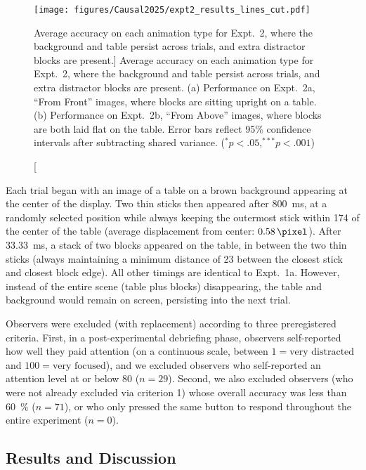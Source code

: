 \begin{figure}[ht]
    \centering
    \texttt{[image: figures/Causal2025/expt2\_results\_lines\_cut.pdf]}
    \caption
    [Average accuracy on each animation type for Expt.~2, where the background and table persist across trials, and extra distractor blocks are present.]
    {Average accuracy on each animation type for Expt.~2, where the background and table persist across trials, and extra distractor blocks are present.  (a) Performance on Expt.~2a, “From Front” images, where blocks are sitting upright on a table.  (b) Performance on Expt.~2b, “From Above” images, where blocks are both laid flat on the table.  Error bars reflect 95\% confidence intervals after subtracting shared variance. ($^{*}p < .05$,$^{***}p < .001$)}
    \label{fig:CausalHist_4}
\end{figure}

Each trial began with an image of a table on a brown background appearing at the center of the display.  Two thin sticks then appeared after \qty{800}{\milli\second}, at a randomly selected position while always keeping the outermost stick within \qty{174}{\pixel} of the center of the table (average displacement from center: $\qty{0.58}{\pixel}$).  After \qty{33.33}{\milli\second}, a stack of two blocks appeared on the table, in between the two thin sticks (always maintaining a minimum distance of \qty{23}{\pixel} between the closest stick and closest block edge).  All other timings are identical to Expt.~1a.  However, instead of the entire scene (table plus blocks) disappearing, the table and background would remain on screen, persisting into the next trial.

Observers were excluded (with replacement) according to three preregistered criteria. First, in a post-experimental debriefing phase, observers self-reported how well they paid attention (on a continuous scale, between $1 = \text{very distracted}$ and $100 = \text{very focused}$), and we excluded observers who self-reported an attention level at or below 80 ($n = 29$). Second, we also excluded observers (who were not already excluded via criterion 1) whose overall accuracy was less than \qty{60}{\percent} ($n = 71$), or who only pressed the same button to respond throughout the entire experiment ($n = 0$).



\subsection{Results and Discussion}

